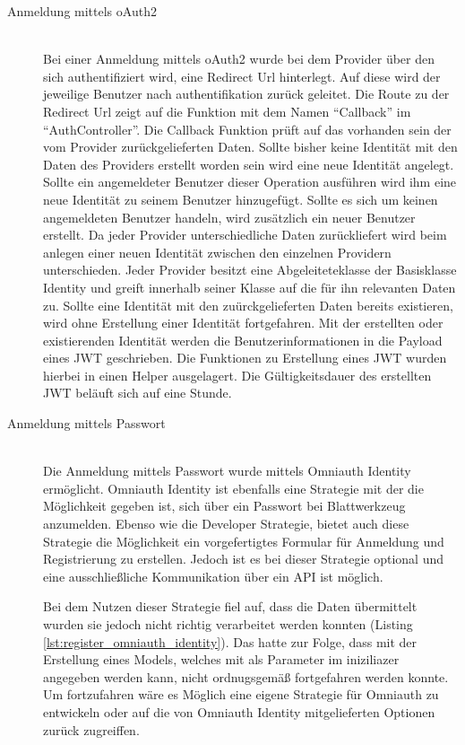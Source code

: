 \documentclass[paper=a4,fontsize=12pt,parskip=half]{scrartcl}
\begin{document}
	\begin{description}
		\item[Anmeldung mittels \gls{oAuth2}]\hfill\\
		Bei einer Anmeldung mittels \gls{oAuth2} wurde bei dem Provider über den sich authentifiziert wird, eine Redirect Url hinterlegt. Auf diese wird der jeweilige Benutzer nach authentifikation zurück geleitet. Die Route zu der Redirect Url zeigt auf die Funktion mit dem Namen \enquote{Callback} im \enquote{AuthController}. Die Callback Funktion prüft auf das vorhanden sein der vom Provider zurückgelieferten Daten. Sollte bisher keine Identität mit den Daten des Providers erstellt worden sein wird eine neue Identität angelegt. Sollte ein angemeldeter Benutzer dieser Operation ausführen wird ihm eine neue Identität zu seinem Benutzer hinzugefügt. Sollte es sich um keinen angemeldeten Benutzer handeln, wird zusätzlich ein neuer Benutzer erstellt. Da jeder Provider unterschiedliche Daten zurückliefert wird beim anlegen einer neuen Identität zwischen den einzelnen Providern unterschieden. Jeder Provider besitzt eine Abgeleiteteklasse der Basisklasse Identity und greift innerhalb seiner Klasse auf die für ihn relevanten Daten zu. Sollte eine Identität mit den zuürckgelieferten Daten bereits existieren, wird ohne Erstellung einer Identität fortgefahren. Mit der erstellten oder existierenden Identität werden die Benutzerinformationen in die Payload eines \gls{JWT} geschrieben. Die Funktionen zu Erstellung eines \gls{JWT} wurden hierbei in einen Helper ausgelagert. Die Gültigkeitsdauer des erstellten \gls{JWT} beläuft sich auf eine Stunde.

		\item[Anmeldung mittels Passwort]\hfill\\
		Die Anmeldung mittels Passwort wurde mittels Omniauth Identity ermöglicht. Omniauth Identity ist ebenfalls eine Strategie mit der die Möglichkeit gegeben ist, sich über ein Passwort bei Blattwerkzeug anzumelden. Ebenso wie die Developer Strategie, bietet auch diese Strategie die Möglichkeit ein vorgefertigtes Formular für Anmeldung und Registrierung zu erstellen. Jedoch ist es bei dieser Strategie optional und eine ausschließliche Kommunikation über ein API ist möglich. 
		
		Bei dem Nutzen dieser Strategie fiel auf, dass die Daten übermittelt wurden sie jedoch nicht richtig verarbeitet werden konnten (Listing \ref{lst:register_omniauth_identity}). Das hatte zur Folge, dass mit der Erstellung eines Models, welches mit als Parameter im iniziliazer angegeben werden kann, nicht ordnugsgemäß fortgefahren werden konnte. Um fortzufahren wäre es Möglich eine eigene Strategie für Omniauth zu entwickeln oder auf die von Omniauth Identity mitgelieferten Optionen zurück zugreiffen.
		

\end{description}
\end{document}
